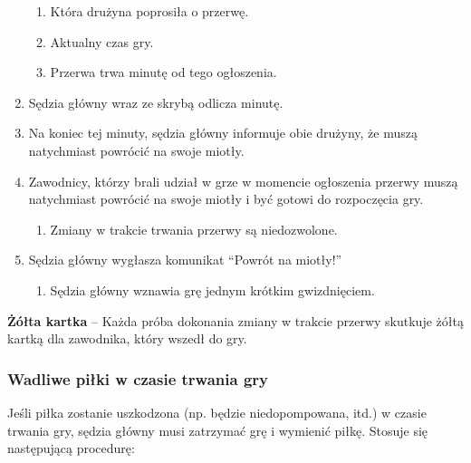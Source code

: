 \documentclass[12pt]{article}
\newcommand\yellowcard[1]{\bgroup\textcolor{darkyellow}{\textbf{#1}}}
\begin{document}
\begin{enumerate}
	      \begin{enumerate}
		      \item
		            Która drużyna poprosiła o przerwę.
		      \item
		            Aktualny czas gry.
		      \item
		            Przerwa trwa minutę od tego ogłoszenia.
	      \end{enumerate}
	\item
	      Sędzia główny wraz ze skrybą odlicza minutę.
	\item
	      Na koniec tej minuty, sędzia główny informuje obie drużyny, że muszą
	      natychmiast powrócić na swoje miotły.
	\item
	      Zawodnicy, którzy brali udział w grze w momencie ogłoszenia przerwy
	      muszą natychmiast powrócić na swoje miotły i być gotowi do rozpoczęcia
	      gry.

	      \begin{enumerate}
		      \item
		            Zmiany w trakcie trwania przerwy są niedozwolone.
	      \end{enumerate}
	\item
	      Sędzia główny wygłasza komunikat ``Powrót na miotły!''

	      \begin{enumerate}
		      \item
		            Sędzia główny wznawia grę jednym krótkim gwizdnięciem.
	      \end{enumerate}
\end{enumerate}

\yellowcard{Żółta kartka} -- Każda próba dokonania zmiany w trakcie przerwy
skutkuje żółtą kartką dla zawodnika, który wszedł do gry.

\subsubsection{Wadliwe piłki w czasie trwania gry}

Jeśli piłka zostanie uszkodzona (np. będzie niedopompowana, itd.) w
czasie trwania gry, sędzia główny musi zatrzymać grę i wymienić piłkę.
Stosuje się następującą procedurę:
\end{document}

